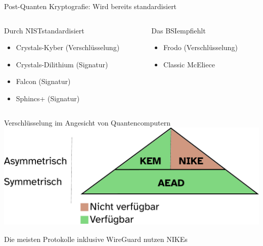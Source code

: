 \documentclass{rosenpass-beamer}
\begin{document}
\begin{frame}{Post-Quanten Kryptografie: Wird bereits standardisiert}

\begin{columns}[T]
\begin{column}{.50\textwidth}

\large Durch NIST\footnotemark standardisiert \cite{nist-selected-algorithms}
\normalsize


\vspace{2mm}

\begin{itemize}
    \item Crystals-Kyber (Verschlüsselung)
    \item Crystals-Dilithium (Signatur)
    \item Falcon (Signatur)
    \item Sphincs+ (Signatur)
\end{itemize}

\end{column}

\begin{column}{.50\textwidth}
\large Das BSI\footnotemark empfiehlt \cite{bsi-quantensicher-gestalten}\normalsize

\vspace{2mm}

\begin{itemize}
    \item Frodo (Verschlüsselung)
    \item Classic McEliece
\end{itemize}

\end{column}
\end{columns}

\end{frame}

\begin{frame}{Verschlüsselung im Angesicht von Quantencomputern}
    \includegraphics[height=.6\textheight]{graphics/Primitivenpyramide.pdf}
      
    Die meisten Protokolle inklusive WireGuard nutzen NIKEs    
\end{frame}
\end{document}
